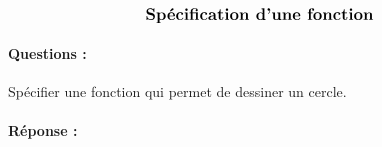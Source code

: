 \documentclass[11pt,a4paper]{article}
\begin{document}
\entete

\autoevaluation


$$\mbox{\textbf{\large Spécification d'une fonction}}$$

\paragraph{Questions :}
Spécifier une fonction qui permet de dessiner un cercle.

\paragraph{Réponse :}\mbox{}

\noindent{}

\noindent{}

\noindent{}

\end{document}
